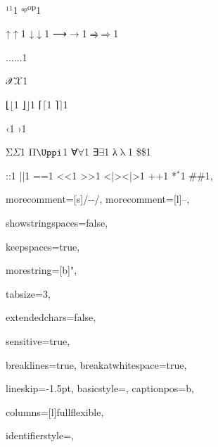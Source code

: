 {{¹}{{\ensuremath{^1}}}1
{ᵒᵖ}{{\color{symbolcolor}\textsuperscript{op}}}1

{↑}{{\color{symbolcolor}\ensuremath{\uparrow}}}1
{↓}{{\color{symbolcolor}\ensuremath{\downarrow}}}1
{⟶}{{\color{symbolcolor}\ensuremath{\longrightarrow}}}1
{⥤}{{\color{symbolcolor}\ensuremath{\Rightarrow}}}1

{...}{{\ensuremath{\ldots}}}1

{𝒳}{{\ensuremath{\mathcal{X}}}}1

{⌊}{{\ensuremath{\lfloor}}}1
{⌋}{{\ensuremath{\rfloor}}}1
{⌈}{{\ensuremath{\lceil}}}1
{⌉}{{\ensuremath{\rceil}}}1

{‹}{{\guilsinglleft}}1
{›}{{\guilsinglright}}1

{Σ}{{\color{symbolcolor}\ensuremath{\Sigma}}}1
{Π}{{\color{symbolcolor}\ensuremath{\Uppi}}}1 %
{∀}{{\color{symbolcolor}\ensuremath{\forall}}}1
{∃}{{\color{symbolcolor}\ensuremath{\exists}}}1
{λ}{{\color{symbolcolor}\ensuremath{\uplambda}}}1
{\$}{{\color{symbolcolor}\$}}1

{:}{{\color{symbolcolor}:}}1
{|}{{\color{symbolcolor}|}}1
{=}{{\color{symbolcolor}=}}1
{<}{{\color{symbolcolor}<}}1
{>}{{\color{symbolcolor}>}}1
{<|>}{{\color{symbolcolor}<|>}}1
{+}{{\color{symbolcolor}+}}1
{*}{{\color{symbolcolor}\ensuremath{{}^{*}}}}1
{\#}{{\color{keywordcolor}\#}}1, %

morecomment=[s]{/-}{-/},
morecomment=[l]{--},

showstringspaces=false,

keepspaces=true,

morestring=[b]{"},

tabsize=3,

extendedchars=false,

sensitive=true,

breaklines=true,
breakatwhitespace=true,

lineskip={-1.5pt},
basicstyle={\ttfamily},
captionpos=b,

columns=[l]fullflexible,


identifierstyle={\ttfamily\color{black}},

}
